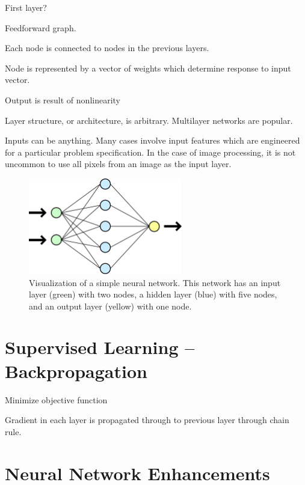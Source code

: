 First layer? 

Feedforward graph. \cite{reed1999neural}


Each node is connected to nodes in the previous layers.

Node is represented by a vector of weights which determine response to input vector.


Output is result of nonlinearity

Layer structure, or architecture, is arbitrary.  Multilayer networks are popular.


Inputs can be anything.  Many cases involve input features which are engineered for a particular problem specification.  In the case of image processing, it is not uncommon to use all pixels from an image as the input layer.

\begin{figure}[t]
  \begin{center}
    \includegraphics[width=0.6\textwidth]{figures/figures/basicNN.png}
  \end{center}
  \caption[Visualization of a simple neural network ]{Visualization of a simple neural network.  This network has an input layer (green) with two nodes, a hidden layer (blue) with five nodes, and an output layer (yellow) with one node.}

  \label{nnet}
\end{figure}


\section{Supervised Learning -- Backpropagation}


Minimize objective function

Gradient in each layer is propagated through to previous layer through chain rule.



\section{Neural Network Enhancements}

